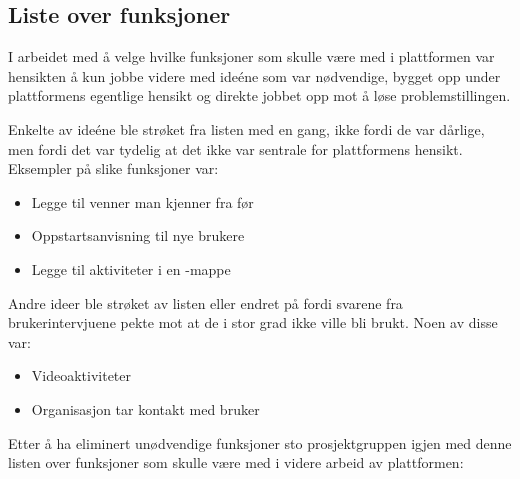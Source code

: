 \subsection{Liste over funksjoner}
I arbeidet med å velge hvilke funksjoner som skulle være med i plattformen var hensikten å kun jobbe videre med ideéne som var nødvendige, bygget opp under plattformens egentlige hensikt og direkte jobbet opp mot å løse problemstillingen.

Enkelte av ideéne ble strøket fra listen med en gang, ikke fordi de var dårlige, men fordi det var tydelig at det ikke var sentrale for plattformens hensikt. Eksempler på slike funksjoner var:

\begin{itemize}
    \item Legge til venner man kjenner fra før
    \item Oppstartsanvisning til nye brukere
    \item Legge til aktiviteter i en -mappe
\end{itemize}

Andre ideer ble strøket av listen eller endret på fordi svarene fra brukerintervjuene pekte mot at de i stor grad ikke ville bli brukt. Noen av disse var:

\begin{itemize}
    \item Videoaktiviteter
    \item Organisasjon tar kontakt med bruker
\end{itemize}

Etter å ha eliminert unødvendige funksjoner sto prosjektgruppen igjen med denne listen over funksjoner som skulle være med i videre arbeid av plattformen:

